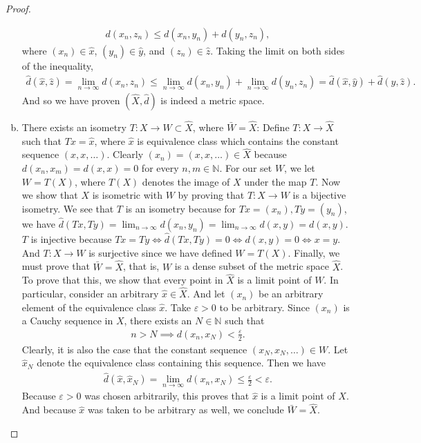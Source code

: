 \documentclass[11pt]{article}
\theoremstyle{mystyle}
\newcommand{\0}{\mathbf{0}}
\begin{document}
\begin{proof}
\begin{enumerate}[(a)]
\begin{align*}
    d(x_n, z_n) \leq d(x_n, y_n) + d(y_n, z_n),
\end{align*}
where $(x_n) \in \hat{x}$, $(y_n) \in \hat{y}$, and $(z_n) \in \hat{z}$. Taking the limit on both sides of the inequality, 
\begin{align*}
    \hat{d}(\hat{x}, \hat{z}) = \lim_{n \to \infty} d(x_n, z_n) \leq \lim_{n \to \infty} d(x_n, y_n) + \lim_{n \to \infty} d(y_n, z_n) = \hat{d}(\hat{x}, \hat{y}) + \hat{d}(\hat{y}, \hat{z}).
\end{align*}\newline
And so we have proven $(\hat{X}, \hat{d})$ is indeed a metric space.

\item There exists an isometry $T: X \longrightarrow W \subset \hat{X}$, where $\bar{W} = \hat{X}$:\newline
Define $T: X \longrightarrow \hat{X}$ such that $Tx = \hat{x}$, where $\hat{x}$ is equivalence class which contains the constant sequence $(x, x, \ldots)$. Clearly $(x_n) = (x, x, \ldots) \in \hat{X}$ because $d(x_n, x_m) = d(x, x) = 0$ for every $n, m \in \mathbb{N}$. For our set $W$, we let $W = T(X)$, where $T(X)$ denotes the image of $X$ under the map $T$.\newline
Now we show that $X$ is isometric with $W$ by proving that $T: X \longrightarrow W$ is a bijective isometry. We see that $T$ is an isometry because for $Tx = (x_n), Ty = (y_n)$, we have $\hat{d}(Tx, Ty) = \lim_{n \to \infty}d(x_n, y_n) = \lim_{n \to \infty}d(x, y) = d(x, y)$. $T$ is injective because $Tx = Ty \iff \hat{d}(Tx, Ty) = 0 \iff d(x, y) = 0 \iff x=y$. And $T: X \longrightarrow W$ is surjective since we have defined $W = T(X)$.\newline
Finally, we must prove that $\bar{W} = \hat{X}$, that is, $W$ is a dense subset of the metric space $\hat{X}$. To prove that this, we show that every point in $\hat{X}$ is a limit point of $W$. In particular, consider an arbitrary $\hat{x} \in \hat{X}$. And let $(x_n)$ be an arbitrary element of the equivalence class $\hat{x}$. Take $\varepsilon > 0$ to be arbitrary. Since $(x_n)$ is a Cauchy sequence in $X$, there exists an $N \in \mathbb{N}$ such that
\begin{align*}
    n > N \implies d(x_n, x_N) < \frac{\varepsilon}{2}.
\end{align*}
Clearly, it is also the case that the constant sequence $(x_N, x_N, \ldots) \in W$. Let $\hat{x}_N$ denote the equivalence class containing this sequence. Then we have
\begin{align*}
    \hat{d}(\hat{x}, \hat{x}_N) = \lim_{n \to \infty}d(x_n, x_N) \leq \frac{\varepsilon}{2} < \varepsilon.
\end{align*}
Because $\varepsilon > 0$ was chosen arbitrarily, this proves that $\hat{x}$ is a limit point of $X$. And because $\hat{x}$ was taken to be arbitrary as well, we conclude $\bar{W} = \hat{X}$.


\end{enumerate}
\end{proof}
\end{document}
